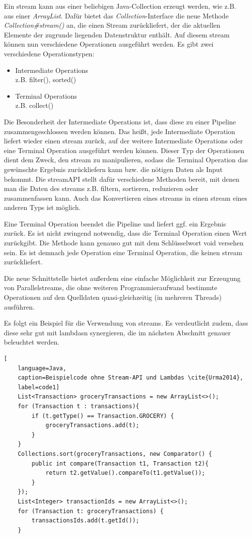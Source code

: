 Ein \gls{stream} kann aus einer beliebigen Java-Collection erzeugt werden, wie z.B. aus einer \textit{ArrayList}. Dafür bietet das \textit{Collection}-Interface die neue Methode \textit{Collection\#stream()} an, die einen Stream zurückliefert, der die aktuellen Elemente der zugrunde liegenden Datenstruktur enthält. Auf diesem \gls{stream} können nun verschiedene Operationen ausgeführt werden. \cite{Urma2014} Es gibt zwei verschiedene Operationstypen:
\begin{itemize}
	\item Intermediate Operations \\z.B. filter(), sorted()
	\item Terminal Operations \\ z.B. collect()
\end{itemize}

Die Besonderheit der Intermediate Operations ist, dass diese zu einer Pipeline zusammengeschlossen werden können. Das heißt, jede Intermediate Operation liefert wieder einen \gls{stream} zurück, auf der weitere Intermediate Operations oder eine Terminal Operation ausgeführt werden können. Dieser Typ der Operationen dient dem Zweck, den \gls{stream} zu manipulieren, sodass die Terminal Operation das gewünschte Ergebnis zurückliefern kann bzw. die nötigen Daten als Input bekommt. Die \gls{streamAPI} stellt dafür verschiedene Methoden bereit, mit denen man die Daten des \gls{stream}s z.B. filtern, sortieren, reduzieren oder zusammenfassen kann. Auch das Konvertieren eines \gls{stream}s in einen \gls{stream} eines anderen Typs ist möglich. \cite{Urma2014}

Eine Terminal Operation beendet die Pipeline und liefert ggf. ein Ergebnis zurück. Es ist nicht zwingend notwendig, dass die Terminal Operation einen Wert zurückgibt. Die Methode kann genauso gut mit dem Schlüsselwort void versehen sein. Es ist demnach jede Operation eine Terminal Operation, die keinen \gls{stream} zurückliefert. \cite{Urma2014}

Die neue Schnittstelle bietet außerdem eine einfache Möglichkeit zur Erzeugung von Parallel\gls{stream}s, die ohne weiteren Programmieraufwand bestimmte Operationen auf den Quelldaten quasi-gleichzeitig (in mehreren Threads) ausführen. \cite{Urma2014}

Es folgt ein Beispiel für die Verwendung von \gls{stream}s. Es verdeutlicht zudem, dass diese sehr gut mit \glspl{lambda}n synergieren, die im nächsten Abschnitt genauer beleuchtet werden.

\begin{lstlisting}[
    language=Java,
    caption=Beispielcode ohne Stream-API und Lambdas \cite{Urma2014},
    label=code1]
	List<Transaction> groceryTransactions = new ArrayList<>();
	for (Transaction t : transactions){
		if (t.getType() == Transaction.GROCERY) {
			groceryTransactions.add(t);
  		}
	}
	Collections.sort(groceryTransactions, new Comparator() {
 		public int compare(Transaction t1, Transaction t2){
			return t2.getValue().compareTo(t1.getValue());
		}
	});
	List<Integer> transactionIds = new ArrayList<>();
	for (Transaction t: groceryTransactions) {
		transactionsIds.add(t.getId());
	}
\end{lstlisting}  

